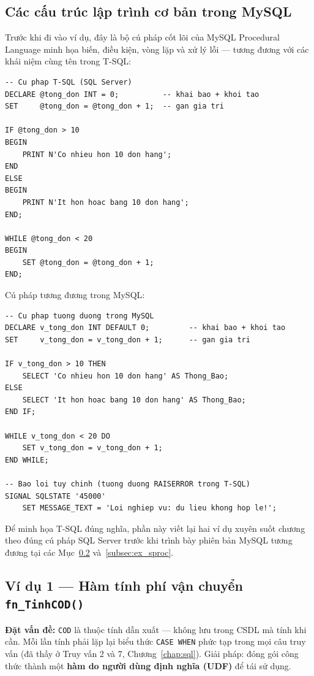 \documentclass[11pt]{report}
\begin{document}
\subsection{Các cấu trúc lập trình cơ bản trong MySQL}
\label{subsec:cautruc_cb}

Trước khi đi vào ví dụ, đây là bộ cú pháp cốt lõi của MySQL Procedural Language minh họa biến, điều kiện, vòng lặp và xử lý lỗi --- tương đương với các khái niệm cùng tên trong T-SQL:

\begin{verbatim}
-- Cu phap T-SQL (SQL Server)
DECLARE @tong_don INT = 0;          -- khai bao + khoi tao
SET     @tong_don = @tong_don + 1;  -- gan gia tri

IF @tong_don > 10
BEGIN
    PRINT N'Co nhieu hon 10 don hang';
END
ELSE
BEGIN
    PRINT N'It hon hoac bang 10 don hang';
END;

WHILE @tong_don < 20
BEGIN
    SET @tong_don = @tong_don + 1;
END;
\end{verbatim}

Cú pháp tương đương trong MySQL:

\begin{verbatim}
-- Cu phap tuong duong trong MySQL
DECLARE v_tong_don INT DEFAULT 0;         -- khai bao + khoi tao
SET     v_tong_don = v_tong_don + 1;      -- gan gia tri

IF v_tong_don > 10 THEN
    SELECT 'Co nhieu hon 10 don hang' AS Thong_Bao;
ELSE
    SELECT 'It hon hoac bang 10 don hang' AS Thong_Bao;
END IF;

WHILE v_tong_don < 20 DO
    SET v_tong_don = v_tong_don + 1;
END WHILE;

-- Bao loi tuy chinh (tuong duong RAISERROR trong T-SQL)
SIGNAL SQLSTATE '45000'
    SET MESSAGE_TEXT = 'Loi nghiep vu: du lieu khong hop le!';
\end{verbatim}

Để minh họa T-SQL đúng nghĩa, phần này viết lại hai ví dụ xuyên suốt chương theo đúng cú pháp SQL Server trước khi trình bày phiên bản MySQL tương đương tại các Mục~\ref{subsec:ex_function} và~\ref{subsec:ex_sproc}.

\subsection{Ví dụ 1 --- Hàm tính phí vận chuyển \texttt{fn\_TinhCOD()}}
\label{subsec:ex_function}

\textbf{Đặt vấn đề:} \texttt{COD} là thuộc tính dẫn xuất --- không lưu trong CSDL mà tính khi cần. Mỗi lần tính phải lặp lại biểu thức \texttt{CASE WHEN} phức tạp trong mọi câu truy vấn (đã thấy ở Truy vấn 2 và 7, Chương~\ref{chap:sql}). Giải pháp: đóng gói công thức thành một \textbf{hàm do người dùng định nghĩa (UDF)} để tái sử dụng.
\end{document}

